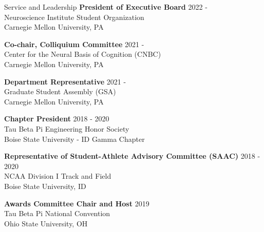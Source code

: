 \documentclass{resume} %
\begin{document}

\begin{rSection}{Service and Leadership}
{\bf President of Executive Board} \hfill {2022 -} \\ 
Neuroscience Institute Student Organization \\
Carnegie Mellon University, PA \smallskip 

{\bf Co-chair, Colliquium Committee} \hfill {2021 -} \\ 
Center for the Neural Basis of Cognition (CNBC) \\
Carnegie Mellon University, PA \smallskip

{\bf Department Representative} \hfill {2021 -} \\ 
Graduate Student Assembly (GSA) \\
Carnegie Mellon University, PA \smallskip

{\bf Chapter President} \hfill {2018 - 2020} \\ 
Tau Beta Pi Engineering Honor Society \\
Boise State University - ID Gamma Chapter \smallskip

{\bf Representative of Student-Athlete Advisory Committee (SAAC)} \hfill {2018 - 2020} \\ 
NCAA Division I Track and Field \\
Boise State University, ID \smallskip

{\bf Awards Committee Chair and Host} \hfill {2019} \\ 
Tau Beta Pi National Convention \\
Ohio State University, OH \smallskip

\end{rSection}
\end{document}
